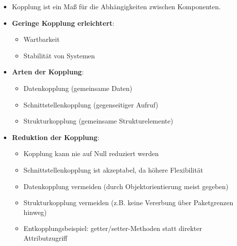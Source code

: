 \documentclass[11pt, a4paper]{article}
\begin{document}
\raggedright

\begin{itemize}
    \item Kopplung ist ein Maß für die Abhängigkeiten zwischen Komponenten.
    \item \textbf{Geringe Kopplung erleichtert}:
    \begin{itemize}
        \item Wartbarkeit
        \item Stabilität von Systemen
    \end{itemize}
    \item \textbf{Arten der Kopplung}:
    \begin{itemize}
        \item Datenkopplung (gemeinsame Daten)
        \item Schnittstellenkopplung (gegenseitiger Aufruf)
        \item Strukturkopplung (gemeinsame Strukturelemente)
    \end{itemize}
    \item \textbf{Reduktion der Kopplung}:
    \begin{itemize}
        \item Kopplung kann nie auf Null reduziert werden
        \item Schnittstellenkopplung ist akzeptabel, da höhere Flexibilität
        \item Datenkopplung vermeiden (durch Objektorientierung meist gegeben)
        \item Strukturkopplung vermeiden (z.B. keine Vererbung über Paketgrenzen hinweg)
        \item Entkopplungsbeispiel: getter/setter-Methoden statt direkter Attributzugriff
    \end{itemize}
\end{itemize}
\end{document}
